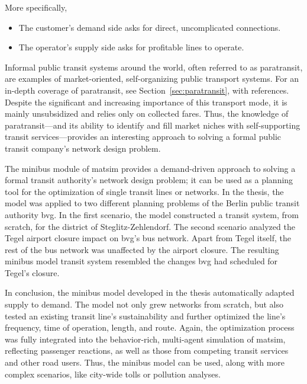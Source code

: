 More specifically,
\begin{itemize}\styleItemize
\item The customer's demand side asks for direct, uncomplicated connections.
\item The operator's supply side asks for profitable lines to operate.
\end{itemize}
Informal public transit systems around the world, often referred to as paratransit, are examples of market-oriented, self-organizing public transport systems. For an in-depth coverage of paratransit, see Section~\ref{sec:paratransit}, with references. Despite the significant and increasing importance of this transport mode, it is mainly unsubsidized and relies only on collected fares. Thus, the knowledge of paratransit---and its ability to identify and fill market niches with self-supporting transit services---provides an interesting approach to solving a formal public transit company's network design problem.

\noindent
The minibus module of \gls{matsim} provides a demand-driven approach to solving a formal transit authority's network design problem; it can be used as a planning tool for the optimization of single transit lines or networks. In the \citet[][]{Neumann2014PhD} thesis, the model was applied to two different planning problems of the Berlin public transit authority \gls{bvg}. In the first scenario, the model constructed a transit system, from scratch, for the district of Steglitz-Zehlendorf. The second scenario analyzed the Tegel airport closure impact on \gls{bvg}'s bus network. Apart from Tegel itself, the rest of the bus network was unaffected by the airport closure. The resulting minibus model transit system resembled the changes \gls{bvg} had scheduled for Tegel's closure.

In conclusion, the minibus model developed in the thesis automatically adapted supply to demand. The model not only grew networks from scratch, but also tested an existing transit line's sustainability and  further optimized the line's frequency, time of operation, length, and route. Again, the optimization process was fully integrated into the behavior-rich, multi-agent simulation of \gls{matsim}, reflecting passenger reactions, as well as those from competing transit services and other road users. Thus, the minibus model can be used, along with more complex scenarios, like city-wide tolls or pollution analyses.

